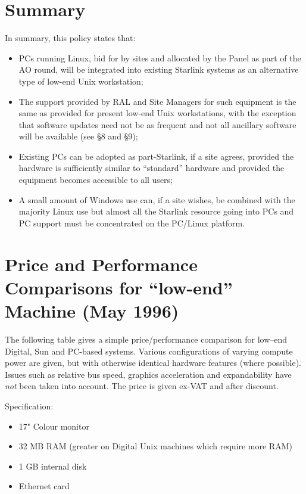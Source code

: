 \documentclass[twoside,11pt]{article}
\begin{document}
\section{Summary}
 
In summary, this policy states that:
\begin{itemize}
\item   PCs running Linux, bid for by sites and allocated by the Panel 
        as part of the
        AO round, will be integrated into existing Starlink systems as an
        alternative type of low-end Unix workstation;
\item   The support provided by RAL and Site Managers for such equipment
        is the same as provided for present low-end Unix workstations, with
        the exception that software updates need not be as frequent and
        not all ancillary software will be available (see \S 8 and \S 9);
\item   Existing PCs can be adopted as part-Starlink, if a site
        agrees, provided the hardware is sufficiently similar to
       ``standard'' hardware and provided the equipment becomes
        accessible to all users;
\item   A small amount of Windows use can, if a site wishes, be
        combined with the majority Linux use but almost all the Starlink 
        resource going into PCs and PC support must be concentrated on the 
        PC/Linux platform.
\end{itemize}
 
\newpage

\appendix

\section{Price and Performance Comparisons for ``low-end'' Machine (May 1996)}

The following table gives a simple price/performance comparison for
low--end Digital, Sun and PC-based systems. Various configurations of
varying compute power are given, but with otherwise identical hardware
features (where possible). Issues such as relative bus speed,
graphics acceleration and expandability have {\em not} been taken into
account. The price is given ex-VAT and after discount.

Specification:
\begin{itemize}
\item 17" Colour monitor
\item 32 MB RAM (greater on Digital Unix machines which require more RAM)
\item 1 GB internal disk
\item Ethernet card
\end{itemize}
 
\end{document}
